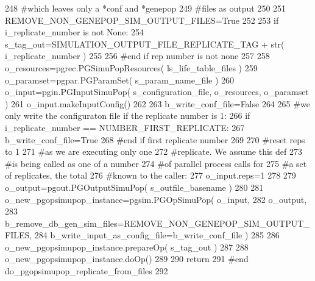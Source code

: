 \begin{DoxyCode}
248     \textcolor{comment}{#which leaves only a *conf and *genepop}
249     \textcolor{comment}{#files as output}
250 
251     REMOVE\_NON\_GENEPOP\_SIM\_OUTPUT\_FILES=\textcolor{keyword}{True}
252 
253     \textcolor{keywordflow}{if} i\_replicate\_number \textcolor{keywordflow}{is} \textcolor{keywordflow}{not} \textcolor{keywordtype}{None}:
254         s\_tag\_out=SIMULATION\_OUTPUT\_FILE\_REPLICATE\_TAG + str( i\_replicate\_number )
255 
256     \textcolor{comment}{#end if rep number is not none}
257 
258     o\_resources=pgrec.PGSimuPopResources( ls\_life\_table\_files )
259     o\_paramset=pgpar.PGParamSet( s\_param\_name\_file )
260     o\_input=pgin.PGInputSimuPop( s\_configuration\_file, o\_resources, o\_paramset ) 
261     o\_input.makeInputConfig()
262 
263     b\_write\_conf\_file=\textcolor{keyword}{False}
264 
265     \textcolor{comment}{#we only write the configuraton file if the replicate number is 1:}
266     \textcolor{keywordflow}{if} i\_replicate\_number == NUMBER\_FIRST\_REPLICATE:
267         b\_write\_conf\_file=\textcolor{keyword}{True}
268     \textcolor{comment}{#end if first replicate number}
269 
270     \textcolor{comment}{#reset reps to 1}
271     \textcolor{comment}{#as we are executing only one}
272     \textcolor{comment}{#replicate.  We assume this def}
273     \textcolor{comment}{#is being called as one of a number}
274     \textcolor{comment}{#of parallel process calls for}
275     \textcolor{comment}{#a set of replicates, the total }
276     \textcolor{comment}{#known to the caller:}
277     o\_input.reps=1
278 
279     o\_output=pgout.PGOutputSimuPop( s\_outfile\_basename )
280 
281     o\_new\_pgopsimupop\_instance=pgsim.PGOpSimuPop( o\_input,
282             o\_output, 
283             b\_remove\_db\_gen\_sim\_files=REMOVE\_NON\_GENEPOP\_SIM\_OUTPUT\_FILES,
284             b\_write\_input\_as\_config\_file=b\_write\_conf\_file )
285 
286     o\_new\_pgopsimupop\_instance.prepareOp( s\_tag\_out  )
287 
288     o\_new\_pgopsimupop\_instance.doOp()
289 
290     \textcolor{keywordflow}{return}
291 \textcolor{comment}{#end do\_pgopsimupop\_replicate\_from\_files}
292 
\end{DoxyCode}

